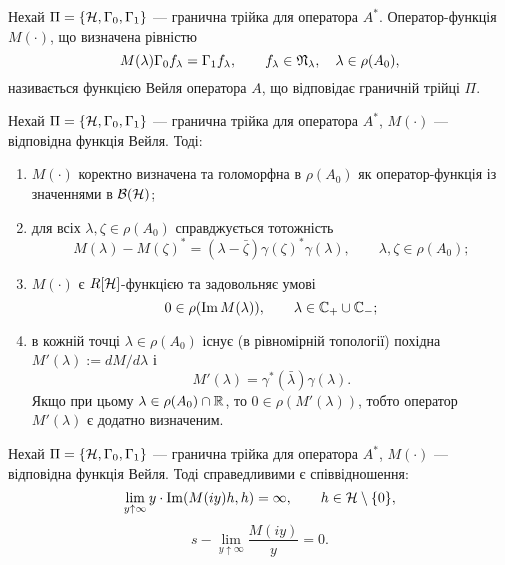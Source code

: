 \begin{definition}
	Нехай $\Pi = \{\mathcal{H}, \Gamma_0, \Gamma_1\}$ --- гранична трійка для оператора $A^*$. Оператор-функція $M(\cdot)$, що визначена рівністю
	\begin{equation*}
		M(\lambda)\Gamma_0f_\lambda = \Gamma_1f_\lambda, \qquad f_\lambda \in \mathfrak{N}_\lambda, \quad \lambda \in \rho(A_0), 
	\end{equation*}
	називається функцією Вейля оператора $A$, що відповідає граничній трійці $\Pi$.
\end{definition}

\begin{theorem} \label{th_vf_1}
	Нехай $\Pi = \{\mathcal{H}, \Gamma_0, \Gamma_1\}$ --- гранична трійка для оператора $A^*$, $M(\cdot)$ --- відповідна функція Вейля. Тоді:
	\begin{enumerate}
		\item $M(\cdot)$ коректно визначена та голоморфна в $\rho(A_0)$ як оператор-функція із значеннями в $\mathcal{B}(\mathcal{H})$;
		\item для всіх $\lambda, \zeta\in\rho(A_0)$ справджується тотожність 
		\begin{equation*}
			M(\lambda)-M(\zeta)^* = (\lambda-\bar\zeta)\gamma(\zeta)^*\gamma(\lambda), \qquad \lambda,\zeta \in \rho(A_0);
		\end{equation*}
		\item \label{iii} $M(\cdot)$ є $R[\mathcal{H}]$-функцією та задовольняє умові
		\begin{equation}\label{eq_vf_1}
			0 \in \rho(\operatorname{Im} M(\lambda)), \qquad \lambda \in \mathbb{C}_+\cup\mathbb{C}_-;
		\end{equation}
		\item в кожній точці $\lambda \in \rho(A_0)$ існує (в рівномірній топології) похідна $M'(\lambda):=dM/d\lambda$ і
		\begin{equation*}
			M'(\lambda) = \gamma^*(\bar\lambda)\gamma(\lambda).
		\end{equation*}
		Якщо при цьому $\lambda \in \rho(A_0)\cap\mathbb{R}$, то $0 \in \rho(M'(\lambda))$, тобто оператор $M'(\lambda)$ є додатно визначеним.
	\end{enumerate}
\end{theorem}

\begin{theorem} \label{th_vf_2}
	Нехай $\Pi = \{\mathcal{H}, \Gamma_0, \Gamma_1\}$ --- гранична трійка для оператора $A^*$, $M(\cdot)$ --- відповідна функція Вейля. Тоді справедливими є співвідношення:
	\begin{equation}\label{eq_vf_2}
		\lim_{y\uparrow\infty}y \cdot \operatorname{Im}(M(iy)h,h) = \infty, \qquad h \in \mathcal{H}\setminus\{0\},
	\end{equation}
	\begin{equation}\label{eq_vf_3}
		s-\lim_{y\uparrow\infty}{\frac{M(iy)}{y}} = 0.
	\end{equation}
\end{theorem}

